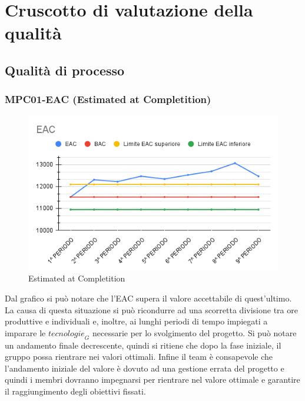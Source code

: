\section{Cruscotto di valutazione della qualità}
\subsection{Qualità di processo}
\subsubsection{MPC01-EAC (Estimated at Completition)}
\begin{figure}[H]
  \centering
  \includegraphics[width=0.7\linewidth]{grafici/EAC.png}
  \caption{Estimated at Completition}
\end{figure}
Dal grafico si può notare che l'EAC supera il valore accettabile di quest'ultimo. La causa di questa situazione si può ricondurre ad una scorretta divisione tra ore produttive e individuali e, inoltre, ai lunghi periodi di tempo impiegati a imparare le $\textit{tecnologie}_G$ necessarie per lo svolgimento del progetto. Si può notare un andamento finale decrescente, quindi si ritiene che dopo la fase iniziale, il gruppo possa rientrare nei valori ottimali. Infine il team è consapevole che l'andamento iniziale del valore è dovuto ad una gestione errata del progetto e quindi i membri dovranno impegnarsi per rientrare nel valore ottimale e garantire il raggiungimento degli obiettivi fissati.

